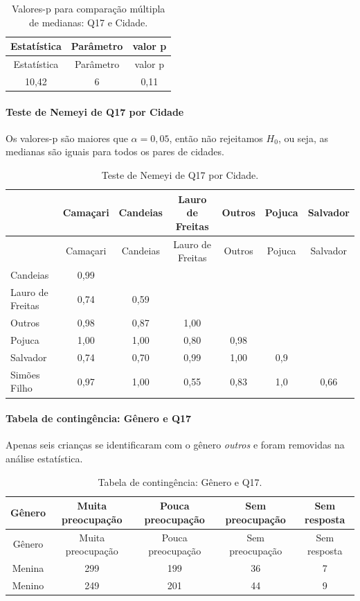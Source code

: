 \documentclass[]{article}
\let\oldparagraph\paragraph
\renewcommand{\paragraph}[1]{\oldparagraph{#1}\mbox{}}
\begin{document}
\begin{longtable}[]{@{}ccc@{}}
\caption{\label{tab:unnamed-chunk-186}Valores-p para comparação múltipla de medianas: Q17 e Cidade.}\tabularnewline
\toprule
Estatística & Parâmetro & valor p\tabularnewline
\midrule
\endfirsthead
\toprule
Estatística & Parâmetro & valor p\tabularnewline
\midrule
\endhead
10,42 & 6 & 0,11\tabularnewline
\bottomrule
\end{longtable}

\hypertarget{teste-de-nemeyi-de-q17-por-cidade}{%
\paragraph{Teste de Nemeyi de Q17 por Cidade}\label{teste-de-nemeyi-de-q17-por-cidade}}

Os valores-p são maiores que \(\alpha=0,05\), então não rejeitamos \(H_0\), ou seja, as medianas são iguais para todos os pares de cidades.

\begin{longtable}[]{@{}lcccccc@{}}
\caption{\label{tab:unnamed-chunk-187}Teste de Nemeyi de Q17 por Cidade.}\tabularnewline
\toprule
& Camaçari & Candeias & Lauro de Freitas & Outros & Pojuca & Salvador\tabularnewline
\midrule
\endfirsthead
\toprule
& Camaçari & Candeias & Lauro de Freitas & Outros & Pojuca & Salvador\tabularnewline
\midrule
\endhead
Candeias & 0,99 & & & & &\tabularnewline
Lauro de Freitas & 0,74 & 0,59 & & & &\tabularnewline
Outros & 0,98 & 0,87 & 1,00 & & &\tabularnewline
Pojuca & 1,00 & 1,00 & 0,80 & 0,98 & &\tabularnewline
Salvador & 0,74 & 0,70 & 0,99 & 1,00 & 0,9 &\tabularnewline
Simões Filho & 0,97 & 1,00 & 0,55 & 0,83 & 1,0 & 0,66\tabularnewline
\bottomrule
\end{longtable}

\cleardoublepage

\hypertarget{tabela-de-continguxeancia-guxeanero-e-q17}{%
\paragraph{Tabela de contingência: Gênero e Q17}\label{tabela-de-continguxeancia-guxeanero-e-q17}}

Apenas seis crianças se identificaram com o gênero \emph{outros} e foram removidas na análise estatística.

\begin{longtable}[]{@{}ccccc@{}}
\caption{\label{tab:unnamed-chunk-188}Tabela de contingência: Gênero e Q17.}\tabularnewline
\toprule
Gênero & Muita preocupação & Pouca preocupação & Sem preocupação & Sem resposta\tabularnewline
\midrule
\endfirsthead
\toprule
Gênero & Muita preocupação & Pouca preocupação & Sem preocupação & Sem resposta\tabularnewline
\midrule
\endhead
Menina & 299 & 199 & 36 & 7\tabularnewline
Menino & 249 & 201 & 44 & 9\tabularnewline
\bottomrule
\end{longtable}
\end{document}

